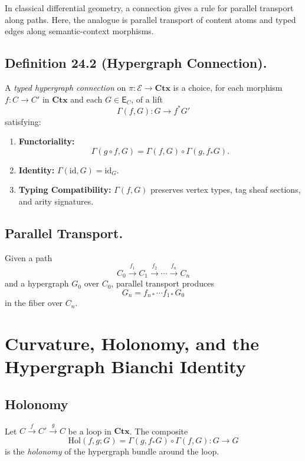 In classical differential geometry, a connection gives a rule for parallel
transport along paths.  
Here, the analogue is parallel transport of content atoms and typed edges along
semantic-context morphisms.

\subsection*{Definition 24.2 (Hypergraph Connection).}
A \emph{typed hypergraph connection} on $\pi : \mathcal{E} \to \mathbf{Ctx}$ is
a choice, for each morphism $f : C \to C'$ in $\mathbf{Ctx}$ and each
$G \in \mathsf{E}_C$, of a lift
\[
\Gamma(f,G) : G \to f^\ast G'
\]
satisfying:
\begin{enumerate}
\item \textbf{Functoriality:} 
\[
\Gamma(g \circ f, G) = \Gamma(f,G) \circ \Gamma(g, f_\ast G).
\]
\item \textbf{Identity:} $\Gamma(\mathrm{id},G) = \mathrm{id}_G$.
\item \textbf{Typing Compatibility:}
$\Gamma(f,G)$ preserves vertex types, tag sheaf sections, and arity signatures.
\end{enumerate}

\subsection*{Parallel Transport.}
Given a path
\[
C_0 \xrightarrow{f_1} C_1 \xrightarrow{f_2} \cdots \xrightarrow{f_n} C_n
\]
and a hypergraph $G_0$ over $C_0$, parallel transport produces
\[
G_n = f_{n\ast}\cdots f_{1\ast} G_0
\]
in the fiber over $C_n$.

\section{Curvature, Holonomy, and the Hypergraph Bianchi Identity}

\subsection{Holonomy}

Let $C \xrightarrow{f} C' \xrightarrow{g} C$ be a loop in $\mathbf{Ctx}$.
The composite
\[
\mathrm{Hol}(f,g;G)
= \Gamma(g,f_\ast G) \circ \Gamma(f,G)
: G \to G
\]
is the \emph{holonomy} of the hypergraph bundle around the loop.

